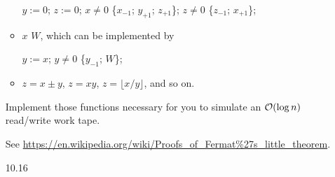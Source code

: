 \begin{itemize}
\begin{itemize}
		$y := 0$; $z := 0$;  $x \neq 0$  \{$x_{-1}$; $y_{+1}$; $z_{+1}$\};  $z \neq 0$  \{$z_{-1}$; $x_{+1}$\}; 
		
		\item {} $x$  $W$, which can be implemented by
		
		$y := x$;  $y \neq 0$  \{$y_{-1}$; $W$\};
		
		\item $z = x \pm y$, $z = xy$, $z = \lfloor x/y \rfloor$, and so on.
	\end{itemize}
	Implement those functions necessary for you to simulate an $\mathcal{O}(\log n)$ read/write work tape.
	
	\item[\Star 10.15]
	See \url{https://en.wikipedia.org/wiki/Proofs_of_Fermat\%27s_little_theorem}.
	
	\item[10.16]
	\Omit
	
\end{itemize}
